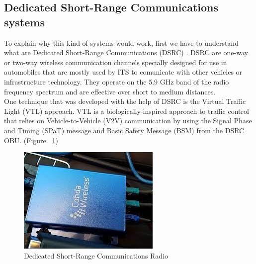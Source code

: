 \documentclass[17pt]{article}
\begin{document}
\pagebreak

\subsection{Dedicated Short-Range Communications systems}
\indent \indent
To explain why this kind of systems would work, first we have to understand what
are Dedicated Short-Range Communications (DSRC) \cite{Zhang2018}
\cite{Tomar2022}. DSRC are one-way or two-way wireless communication channels
specially designed for use in automobiles that are mostly used by ITS to
comunicate with other vehicles or infrastructure technology. They operate on
the 5.9 GHz band of the radio frequency spectrum and are effective over short
to medium distances.\\
\indent \indent
One technique that was developed with the help of DSRC is the Virtual Traffic
Light (VTL) approach. VTL is a biologically-inspired approach to traffic
control that relies on Vehicle-to-Vehicle (V2V) communication by using the
Signal Phase and Timing (SPaT) message and Basic Safety Message (BSM) from
the DSRC OBU. (Figure ~\ref{fig:DSRCRadio})
\begin{figure}[h!]
    \includegraphics[width=\textwidth]{DSRCRadio.jpeg}
    \caption{Dedicated Short-Range Communications Radio \textcopyright}
    \label{fig:DSRCRadio}
\end{figure}\\
\end{document}
